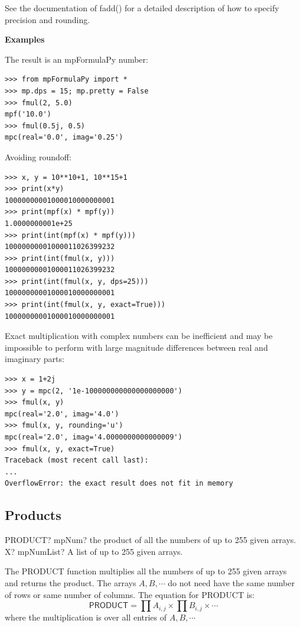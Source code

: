 \vpara
See the documentation of fadd() for a detailed description of how to specify precision and rounding.

\vpara
\textbf{Examples}


The result is an mpFormulaPy number:

\begin{lstlisting}
>>> from mpFormulaPy import *
>>> mp.dps = 15; mp.pretty = False
>>> fmul(2, 5.0)
mpf('10.0')
>>> fmul(0.5j, 0.5)
mpc(real='0.0', imag='0.25')
\end{lstlisting}


Avoiding roundoff:

\begin{lstlisting}
>>> x, y = 10**10+1, 10**15+1
>>> print(x*y)
10000000001000010000000001
>>> print(mpf(x) * mpf(y))
1.0000000001e+25
>>> print(int(mpf(x) * mpf(y)))
10000000001000011026399232
>>> print(int(fmul(x, y)))
10000000001000011026399232
>>> print(int(fmul(x, y, dps=25)))
10000000001000010000000001
>>> print(int(fmul(x, y, exact=True)))
10000000001000010000000001
\end{lstlisting}


Exact multiplication with complex numbers can be inefficient and may be impossible to perform with large magnitude differences between real and imaginary parts:

\begin{lstlisting}
>>> x = 1+2j
>>> y = mpc(2, '1e-100000000000000000000')
>>> fmul(x, y)
mpc(real='2.0', imag='4.0')
>>> fmul(x, y, rounding='u')
mpc(real='2.0', imag='4.0000000000000009')
>>> fmul(x, y, exact=True)
Traceback (most recent call last):
...
OverflowError: the exact result does not fit in memory
\end{lstlisting}




\subsection{Products}

\begin{mpFunctionsExtract}
	\mpWorksheetFunctionOneNotImplemented
	{PRODUCT? mpNum? the product of all the numbers of up to 255 given arrays.}
	{X? mpNumList? A list of up to 255 given arrays.}
\end{mpFunctionsExtract}

\vspace{0.3cm}
The \textsf{PRODUCT} function multiplies all the numbers of  up to 255 given arrays and returns the product. The arrays $A, B, \cdots$ do not need have the same number of rows or same number of columns.
The equation for \textsf{PRODUCT} is:
\begin{equation}
	\textsf{PRODUCT} = \prod A_{i,j} \times \prod B_{i,j} \times \cdots
\end{equation}
where the multiplication is over all entries of $A, B, \cdots$ 




